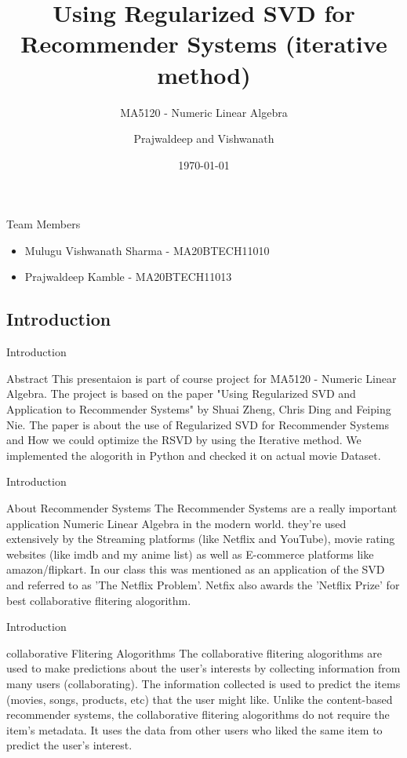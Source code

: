 \documentclass{beamer}
\title{Using Regularized SVD for Recommender Systems (iterative method)}
\subtitle{MA5120 - Numeric Linear Algebra}
\date{\today}
\author{Prajwaldeep and Vishwanath}
\begin{document}
\begin{frame}
\titlepage
\end{frame}
\begin{frame}{Team Members}
\begin{itemize}
    \item Mulugu Vishwanath Sharma - MA20BTECH11010
    \item Prajwaldeep Kamble - MA20BTECH11013
\end{itemize}
\end{frame}
\begin{frame}
\section{Introduction}
\end{frame}
\begin{frame}{Introduction}
   \begin{block}{Abstract}
    This presentaion is part of course project for MA5120 - Numeric Linear Algebra. The project is based on the paper "Using Regularized SVD and Application to Recommender Systems" by Shuai Zheng, Chris Ding and Feiping Nie. 
    The paper is about the use of Regularized SVD for Recommender Systems and How we could optimize the RSVD by using the Iterative method. We implemented the alogorith in Python and checked it on actual movie Dataset. 
   \end{block} 
\end{frame}
\begin{frame}{Introduction}
   \begin{block}{About Recommender Systems}
    The Recommender Systems are a really important application Numeric Linear Algebra in the modern world.
    they're used extensively by the Streaming platforms (like Netflix and YouTube), movie rating websites (like imdb and my anime list) as well as E-commerce platforms like amazon/flipkart. 
    In our class this was mentioned as an application of the SVD and referred to as 'The Netflix Problem'. Netfix also awards the 'Netflix Prize' for best collaborative flitering alogorithm.
   \end{block} 
\end{frame}
\begin{frame}{Introduction}
    \begin{block}{collaborative Flitering Alogorithms}
    The collaborative flitering alogorithms are used to make predictions about the user's interests by collecting information from many users (collaborating). The information collected is used to predict the items (movies, songs, products, etc) that the user might like.
    Unlike the content-based recommender systems, the collaborative flitering alogorithms do not require the item's metadata.
    It uses the data from other users who liked the same item to predict the user's interest.
    \end{block} 
 \end{frame}
\end{document}
